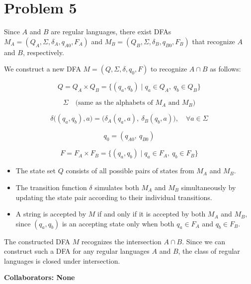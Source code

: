 \documentclass[12 pt]{article}
\begin{document}
\vspace{20pt}

\section*{Problem 5}

Since \( A \) and \( B \) are regular languages, there exist DFAs \( M_A = (Q_A, \Sigma, \delta_A, q_{A0}, F_A) \) and \( M_B = (Q_B, \Sigma, \delta_B, q_{B0}, F_B) \) that recognize \( A \) and \( B \), respectively.

We construct a new DFA \( M = (Q, \Sigma, \delta, q_0, F) \) to recognize \( A \cap B \) as follows:
    
    \[
    Q = Q_A \times Q_B = \{ (q_a, q_b) \mid q_a \in Q_A, \ q_b \in Q_B \}
    \]
    
    \[
    \Sigma \quad \text{(same as the alphabets of } M_A \text{ and } M_B)
    \]
    
    \[
    \delta\big( (q_a, q_b), a \big) = \big( \delta_A(q_a, a),\  \delta_B(q_b, a) \big), \quad \forall a \in \Sigma
    \]
    
    \[
    q_0 = (q_{A0},\ q_{B0})
    \]
    
    \[
    F = F_A \times F_B = \{ (q_a, q_b) \mid q_a \in F_A,\  q_b \in F_B \}
    \]

\begin{itemize}
    \item The state set \( Q \) consists of all possible pairs of states from \( M_A \) and \( M_B \).
    \item The transition function \( \delta \) simulates both \( M_A \) and \( M_B \) simultaneously by updating the state pair according to their individual transitions.
    \item A string is accepted by \( M \) if and only if it is accepted by both \( M_A \) and \( M_B \), since \( (q_a, q_b) \) is an accepting state only when both \( q_a \in F_A \) and \( q_b \in F_B \).
\end{itemize}

The constructed DFA \( M \) recognizes the intersection \( A \cap B \). Since we can construct such a DFA for any regular languages \( A \) and \( B \), the class of regular languages is closed under intersection.

\vspace{20pt}

\noindent\textbf{Collaborators: None}
\end{document}
